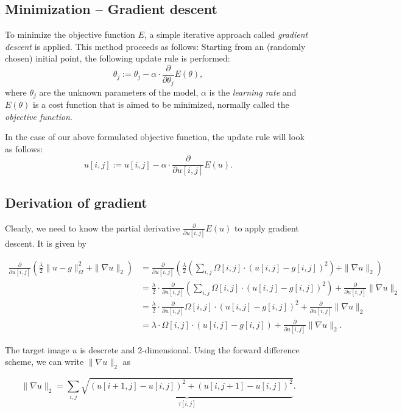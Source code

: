 \documentclass{paper}
\begin{document}
\subsection*{Minimization -- Gradient descent}
To minimize the objective function $E$, a simple iterative approach called \emph{gradient descent} is applied. This method proceeds as follows: Starting from an (randomly chosen) initial point, the following update rule is performed:
\begin{equation}
\theta_j := \theta_j - \alpha \cdot \frac{\partial}{\partial \theta_j} E(\theta),
\label{eq:update-rule}
\end{equation}
where $\theta_j$ are the unknown parameters of the model, $\alpha$ is the \emph{learning rate} and $E(\theta)$ is a cost function that is aimed to be minimized, normally called the \emph{objective function}.

In the case of our above formulated objective function, the update rule will look as follows:
$$ u[i,j] := u[i,j] - \alpha \cdot \frac{\partial}{\partial u[i,j]} E(u).$$
\subsection*{Derivation of gradient}
Clearly, we need to know the partial derivative $\frac{\partial}{\partial u[i,j]} E(u)$ to apply gradient descent. It is given by

\begin{align*}
 \frac{\partial}{\partial u[i,j]} \left( \frac{\lambda}{2} \|u-g\|_\Omega^2 + \|\nabla u\|_2 \right) &= \frac{\partial}{\partial u[i,j]} \left( \frac{\lambda}{2} \left(\sum_{i,j} \Omega[i,j] \cdot (u[i,j] - g[i,j])^2\right) + \|\nabla u\|_2 \right) \\
&= \frac{\lambda}{2} \cdot \frac{\partial}{\partial u[i,j]} \left(\sum_{i,j} \Omega[i,j] \cdot (u[i,j] - g[i,j])^2\right) + \frac{\partial}{\partial u[i,j]} \|\nabla u \|_2 \\
%
&= \frac{\lambda}{2} \cdot \frac{\partial}{\partial u[i,j]} \Omega[i,j] \cdot (u[i,j] - g[i,j])^2 + \frac{\partial}{\partial u[i,j]} \|\nabla u \|_2 \\
%
&= \lambda \cdot \Omega[i,j] \cdot (u[i,j] - g[i,j]) + \frac{\partial}{\partial u[i,j]} \|\nabla u \|_2. 
\end{align*}

The target image $u$ is descrete and 2-dimensional. Using the forward difference scheme, we can write $\|\nabla u \|_2$ as

\begin{equation} \|\nabla u \|_2 = \sum_{i,j} \underbrace{\sqrt{(u[i+1,j] - u [i,j])^2 + (u[i,j+1] - u[i,j])^2}}_{\tau[i,j]}.
 \label{eq:grad}
\end{equation}
\end{document}
